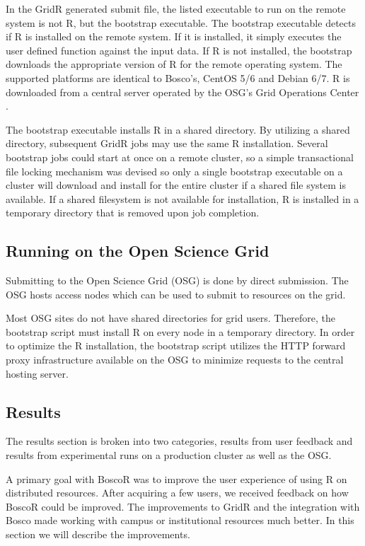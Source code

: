 In the GridR generated submit file, the listed executable to run on the remote system is not R, but the bootstrap executable.  The bootstrap executable detects if R is installed on the remote system.  If it is installed, it simply executes the user defined function against the input data.  If R is not installed, the bootstrap downloads the appropriate version of R for the remote operating system.  The supported platforms are identical to Bosco's, CentOS 5/6 and Debian 6/7.  R is downloaded from a central server operated by the OSG's Grid Operations Center \cite{osgoperations}.  

The bootstrap executable installs R in a shared directory.  By utilizing a shared directory, subsequent GridR jobs may use the same R installation.  Several bootstrap jobs could start at once on a remote cluster, so a simple transactional file locking mechanism was devised so only a single bootstrap executable on a cluster will download and install for the entire cluster if a shared file system is available.  If a shared filesystem is not available for installation, R is installed in a temporary directory that is removed upon job completion.

\subsection{Running on the Open Science Grid}

Submitting to the Open Science Grid (OSG) is done by direct submission.  The OSG hosts access nodes which can be used to submit to resources on the grid.

Most OSG sites do not have shared directories for grid users.  Therefore, the bootstrap script must install R on every node in a temporary directory.  In order to optimize the R installation, the bootstrap script utilizes the HTTP forward proxy infrastructure \cite{garzoglio2012supporting} available on the OSG to minimize requests to the central hosting server.


\subsection{Results}
\label{sec:boscorresults}

The results section is broken into two categories, results from user feedback and results from experimental runs on a production cluster as well as the OSG.

A primary goal with BoscoR was to improve the user experience of using R on distributed resources. After acquiring a few users, we received feedback on how BoscoR could be improved.  The improvements to GridR and the integration with Bosco made working with campus or institutional resources much better.  In this section we will describe the improvements.

